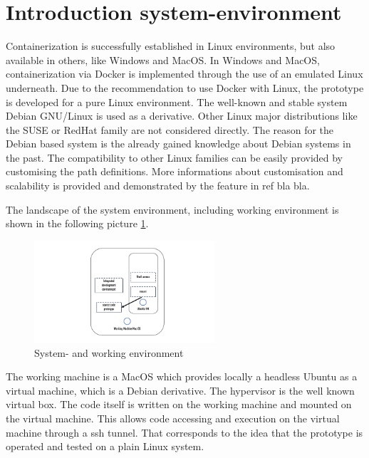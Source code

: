 \section{Introduction system-environment}
\label{ch:practical_realization:sys_env}

Containerization is successfully established in Linux environments, but also available in others, like Windows and MacOS.
In Windows and MacOS, containerization via Docker is implemented through the use of an emulated Linux underneath.
Due to the recommendation to use Docker with Linux, the prototype is developed for a pure Linux environment.
The well-known and stable system Debian GNU/Linux is used as a derivative. Other Linux major distributions like the SUSE or RedHat family are not considered directly. The reason for the Debian based system is the already gained knowledge about Debian systems in the past. The compatibility to other Linux families can be easily provided by customising the path definitions. More informations about customisation and scalability is provided and demonstrated by the feature in ref bla bla.

The landscape of the system environment, including working environment is shown in the following picture \ref{fig:pract:sys_env}.
\begin{figure}[h!]
 \centering
 \includegraphics[width=0.6\textwidth]{gfx/examples/sys_env.png}
 \caption{System- and working environment}
 \label{fig:pract:sys_env}
\end{figure}
The working machine is a MacOS which provides locally a headless Ubuntu as a virtual machine, which is a Debian derivative. The hypervisor is the well known virtual box.
The code itself is written on the working machine and mounted on the virtual machine. This allows code accessing and execution on the virtual machine through a ssh tunnel. That corresponds to the idea that the prototype is operated and tested on a plain Linux system.

